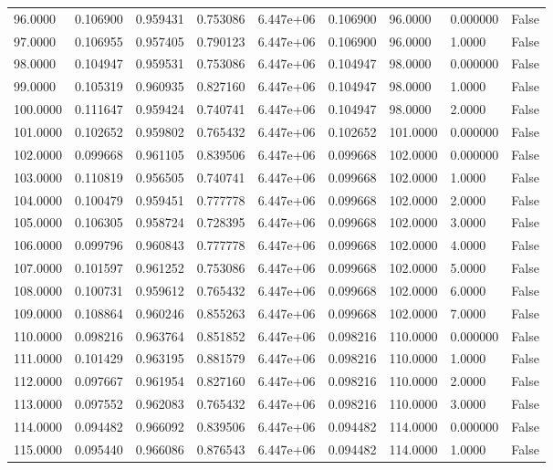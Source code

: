 \documentclass[11pt]{report}
\begin{document}
\begin{longtable}{lllllllll}
96.0000 & 0.106900 & 0.959431 & 0.753086 & 6.447e+06 & 0.106900 & 96.0000 & 0.000000 & False \\
97.0000 & 0.106955 & 0.957405 & 0.790123 & 6.447e+06 & 0.106900 & 96.0000 & 1.0000 & False \\
98.0000 & 0.104947 & 0.959531 & 0.753086 & 6.447e+06 & 0.104947 & 98.0000 & 0.000000 & False \\
99.0000 & 0.105319 & 0.960935 & 0.827160 & 6.447e+06 & 0.104947 & 98.0000 & 1.0000 & False \\
100.0000 & 0.111647 & 0.959424 & 0.740741 & 6.447e+06 & 0.104947 & 98.0000 & 2.0000 & False \\
101.0000 & 0.102652 & 0.959802 & 0.765432 & 6.447e+06 & 0.102652 & 101.0000 & 0.000000 & False \\
102.0000 & 0.099668 & 0.961105 & 0.839506 & 6.447e+06 & 0.099668 & 102.0000 & 0.000000 & False \\
103.0000 & 0.110819 & 0.956505 & 0.740741 & 6.447e+06 & 0.099668 & 102.0000 & 1.0000 & False \\
104.0000 & 0.100479 & 0.959451 & 0.777778 & 6.447e+06 & 0.099668 & 102.0000 & 2.0000 & False \\
105.0000 & 0.106305 & 0.958724 & 0.728395 & 6.447e+06 & 0.099668 & 102.0000 & 3.0000 & False \\
106.0000 & 0.099796 & 0.960843 & 0.777778 & 6.447e+06 & 0.099668 & 102.0000 & 4.0000 & False \\
107.0000 & 0.101597 & 0.961252 & 0.753086 & 6.447e+06 & 0.099668 & 102.0000 & 5.0000 & False \\
108.0000 & 0.100731 & 0.959612 & 0.765432 & 6.447e+06 & 0.099668 & 102.0000 & 6.0000 & False \\
109.0000 & 0.108864 & 0.960246 & 0.855263 & 6.447e+06 & 0.099668 & 102.0000 & 7.0000 & False \\
110.0000 & 0.098216 & 0.963764 & 0.851852 & 6.447e+06 & 0.098216 & 110.0000 & 0.000000 & False \\
111.0000 & 0.101429 & 0.963195 & 0.881579 & 6.447e+06 & 0.098216 & 110.0000 & 1.0000 & False \\
112.0000 & 0.097667 & 0.961954 & 0.827160 & 6.447e+06 & 0.098216 & 110.0000 & 2.0000 & False \\
113.0000 & 0.097552 & 0.962083 & 0.765432 & 6.447e+06 & 0.098216 & 110.0000 & 3.0000 & False \\
114.0000 & 0.094482 & 0.966092 & 0.839506 & 6.447e+06 & 0.094482 & 114.0000 & 0.000000 & False \\
115.0000 & 0.095440 & 0.966086 & 0.876543 & 6.447e+06 & 0.094482 & 114.0000 & 1.0000 & False \\

\end{longtable}
\end{document}
